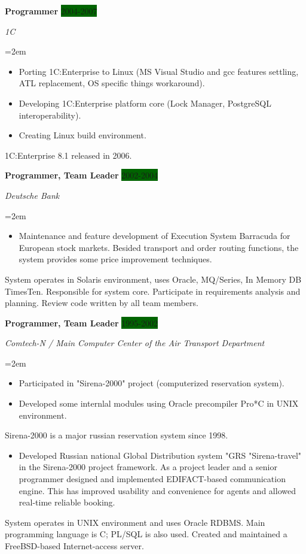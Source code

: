 \documentclass[paper=a4,fontsize=11pt]{scrartcl} %
\newcommand{\sepspace}{\vspace*{1em}}       %
\newcommand{\EducationEntry}[4]{\pagebreak[2]
        \noindent \textbf{#1} \hfill      %
        \colorbox{DarkGreen}{%
            \parbox{6em}{%
            \hfill\color{White}#2}} \par  %
        \noindent \textit{#3} \par        %
        \noindent\hangindent=2em\hangafter=0 \small #4 %
        \normalsize \par}
\newcommand{\WorkEntry}[4]{\pagebreak[2]    %
        \noindent \textbf{#1} \hfill      %
        \colorbox{DarkGreen}{\color{White}#2} \par  %
        \noindent \textit{#3} \par        %
        \noindent\hangindent=2em\hangafter=0 \small #4 %
        \normalsize \par         \sepspace}
\begin{document}
\WorkEntry{Programmer}{2004-2007}{1C}{
\begin{itemize}\itemsep0em
\item Porting 1C:Enterprise to Linux (MS Visual Studio and gcc features settling, ATL replacement, OS specific things workaround).
\item Developing 1C:Enterprise platform core (Lock Manager, PostgreSQL interoperability).
\item Creating Linux build environment.
\end{itemize}
1C:Enterprise 8.1 released in 2006.
}

\WorkEntry{Programmer, Team Leader}{2002-2004}{Deutsche Bank}{
\begin{itemize}\itemsep0em
\item  Maintenance and feature development of Execution System Barracuda for European stock markets. Besided transport and order routing functions, the system provides some price improvement techniques.
\end{itemize}
System operates in Solaris environment, uses Oracle, MQ/Series, In Memory DB TimesTen.
Responsible for system core.
Participate in requirements analysis and planning. 
Review code written by all team members.
}

\WorkEntry{Programmer, Team Leader}{1995-2002}{Comtech-N / Main Computer Center of the Air Transport Department}{
\begin{itemize}\itemsep0em
\item Participated in "Sirena-2000" project  (computerized reservation system).
\item Developed some internlal modules using Oracle precompiler Pro*C in UNIX environment. 
\end{itemize}  
Sirena-2000 is a major russian reservation system since 1998. 
\begin{itemize}\itemsep0em
\item Developed Russian national Global Distribution system "GRS "Sirena-travel" in the Sirena-2000 project framework. As a project leader and a senior programmer designed and implemented EDIFACT-based communication engine. This has improved usability and convenience for agents and allowed real-time reliable booking.
\end{itemize}
System operates in UNIX environment and uses Oracle RDBMS.
Main programming language is C; PL/SQL is also used.
Created and maintained a FreeBSD-based Internet-access server.
}
\end{document}
